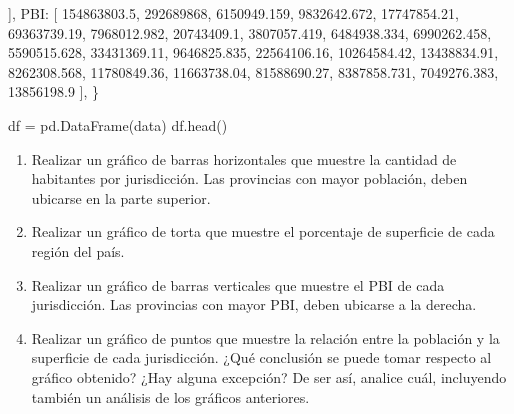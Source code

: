 \documentclass[
  letterpaper,
  DIV=11,
  numbers=noendperiod]{scrreprt}
\newenvironment{Shaded}{\begin{snugshade}}{\end{snugshade}}
\newcommand{\DecValTok}[1]{\textcolor[rgb]{0.68,0.00,0.00}{#1}}
\newcommand{\FloatTok}[1]{\textcolor[rgb]{0.68,0.00,0.00}{#1}}
\newcommand{\NormalTok}[1]{\textcolor[rgb]{0.00,0.23,0.31}{#1}}
\newcommand{\OperatorTok}[1]{\textcolor[rgb]{0.37,0.37,0.37}{#1}}
\newcommand{\StringTok}[1]{\textcolor[rgb]{0.13,0.47,0.30}{#1}}
\providecommand{\tightlist}{%
  \setlength{\itemsep}{0pt}\setlength{\parskip}{0pt}}\usepackage{longtable,booktabs,array}
\begin{document}
\begin{enumerate}
\begin{Shaded}
\begin{Highlighting}[]
\NormalTok{    ],}
    \StringTok{\textquotesingle{}PBI\textquotesingle{}}\NormalTok{: [}
        \FloatTok{154863803.5}\NormalTok{, }\DecValTok{292689868}\NormalTok{, }\FloatTok{6150949.159}\NormalTok{, }\FloatTok{9832642.672}\NormalTok{, }\FloatTok{17747854.21}\NormalTok{, }\FloatTok{69363739.19}\NormalTok{,}
        \FloatTok{7968012.982}\NormalTok{, }\FloatTok{20743409.1}\NormalTok{, }\FloatTok{3807057.419}\NormalTok{, }\FloatTok{6484938.334}\NormalTok{, }\FloatTok{6990262.458}\NormalTok{, }\FloatTok{5590515.628}\NormalTok{,}
        \FloatTok{33431369.11}\NormalTok{, }\FloatTok{9646825.835}\NormalTok{, }\FloatTok{22564106.16}\NormalTok{, }\FloatTok{10264584.42}\NormalTok{, }\FloatTok{13438834.91}\NormalTok{, }\FloatTok{8262308.568}\NormalTok{,}
        \FloatTok{11780849.36}\NormalTok{, }\FloatTok{11663738.04}\NormalTok{, }\FloatTok{81588690.27}\NormalTok{, }\FloatTok{8387858.731}\NormalTok{, }\FloatTok{7049276.383}\NormalTok{, }\FloatTok{13856198.9}
\NormalTok{    ],}
\NormalTok{\}}

\NormalTok{df }\OperatorTok{=}\NormalTok{ pd.DataFrame(data)}
\NormalTok{df.head()}
\end{Highlighting}
\end{Shaded}

  \begin{enumerate}
  \def\labelenumii{\alph{enumii}.}
  \tightlist
  \item
    Realizar un gráfico de barras horizontales que muestre la cantidad
    de habitantes por jurisdicción. Las provincias con mayor población,
    deben ubicarse en la parte superior.
  \item
    Realizar un gráfico de torta que muestre el porcentaje de superficie
    de cada región del país.
  \item
    Realizar un gráfico de barras verticales que muestre el PBI de cada
    jurisdicción. Las provincias con mayor PBI, deben ubicarse a la
    derecha.
  \item
    Realizar un gráfico de puntos que muestre la relación entre la
    población y la superficie de cada jurisdicción. ¿Qué conclusión se
    puede tomar respecto al gráfico obtenido? ¿Hay alguna excepción? De
    ser así, analice cuál, incluyendo también un análisis de los
    gráficos anteriores.
  \end{enumerate}
\end{enumerate}
\end{document}
